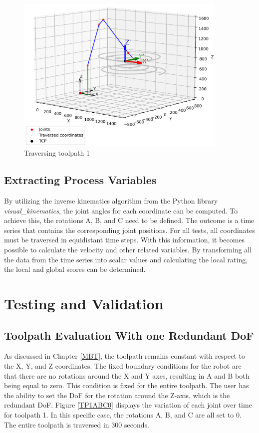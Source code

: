 \begin{figure}[H]
	\centerline{\includegraphics[width=0.9\textwidth]{figures/robotANDpath1.png}}
	\caption{Traversing toolpath 1}
	\label{TP1robot}
\end{figure}




\subsection{Extracting Process Variables}
By utilizing the inverse kinematics algorithm from the Python library \textit{visual\_kinematics}, the joint angles for each coordinate can be computed. To achieve this, the rotations A, B, and C need to be defined. The outcome is a time series that contains the corresponding joint positions. For all tests, all coordinates must be traversed in equidistant time steps. With this information, it becomes possible to calculate the velocity and other related variables. By transforming all the data from the time series into scalar values and calculating the local rating, the local and global scores can be determined.
\newpage
\section{Testing and Validation}%

\subsection{Toolpath Evaluation With one Redundant DoF}
As discussed in Chapter \ref{MBT}, the toolpath remains constant with respect to the X, Y, and Z coordinates. The fixed boundary conditions for the robot are that there are no rotations around the X and Y axes, resulting in A and B both being equal to zero. This condition is fixed for the entire toolpath. The user has the ability to set the \acrshort{DoF} for the rotation around the Z-axis, which is the redundant \acrshort{DoF}. Figure \ref{TP1ABC0} displays the variation of each joint over time for toolpath 1. In this specific case, the rotations A, B, and C are all set to 0. The entire toolpath is traversed in 300 seconds.

